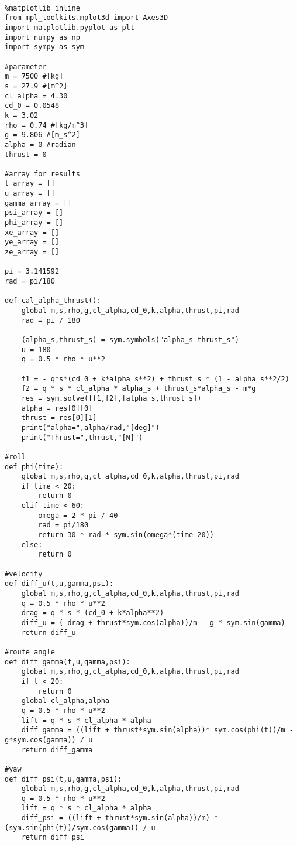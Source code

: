 \documentclass[15pt,uplatex,dvipdfmx]{jsarticle}
\begin{document}
\begin{lstlisting}[basicstyle=\ttfamily\footnotesize, frame=single]

%matplotlib inline
from mpl_toolkits.mplot3d import Axes3D
import matplotlib.pyplot as plt
import numpy as np
import sympy as sym

#parameter
m = 7500 #[kg]
s = 27.9 #[m^2]
cl_alpha = 4.30
cd_0 = 0.0548
k = 3.02
rho = 0.74 #[kg/m^3]
g = 9.806 #[m_s^2]
alpha = 0 #radian
thrust = 0

#array for results
t_array = []
u_array = []
gamma_array = []
psi_array = []
phi_array = []
xe_array = []
ye_array = []
ze_array = []

pi = 3.141592
rad = pi/180

def cal_alpha_thrust():
    global m,s,rho,g,cl_alpha,cd_0,k,alpha,thrust,pi,rad
    rad = pi / 180

    (alpha_s,thrust_s) = sym.symbols("alpha_s thrust_s")
    u = 180
    q = 0.5 * rho * u**2

    f1 = - q*s*(cd_0 + k*alpha_s**2) + thrust_s * (1 - alpha_s**2/2)
    f2 = q * s * cl_alpha * alpha_s + thrust_s*alpha_s - m*g
    res = sym.solve([f1,f2],[alpha_s,thrust_s])
    alpha = res[0][0]
    thrust = res[0][1]
    print("alpha=",alpha/rad,"[deg]")
    print("Thrust=",thrust,"[N]")

#roll
def phi(time):
    global m,s,rho,g,cl_alpha,cd_0,k,alpha,thrust,pi,rad
    if time < 20:
        return 0
    elif time < 60:
        omega = 2 * pi / 40
        rad = pi/180
        return 30 * rad * sym.sin(omega*(time-20))
    else:
        return 0

#velocity
def diff_u(t,u,gamma,psi):
    global m,s,rho,g,cl_alpha,cd_0,k,alpha,thrust,pi,rad
    q = 0.5 * rho * u**2
    drag = q * s * (cd_0 + k*alpha**2)
    diff_u = (-drag + thrust*sym.cos(alpha))/m - g * sym.sin(gamma)
    return diff_u

#route angle
def diff_gamma(t,u,gamma,psi):
    global m,s,rho,g,cl_alpha,cd_0,k,alpha,thrust,pi,rad
    if t < 20:
        return 0
    global cl_alpha,alpha
    q = 0.5 * rho * u**2
    lift = q * s * cl_alpha * alpha
    diff_gamma = ((lift + thrust*sym.sin(alpha))* sym.cos(phi(t))/m - g*sym.cos(gamma)) / u
    return diff_gamma

#yaw
def diff_psi(t,u,gamma,psi):
    global m,s,rho,g,cl_alpha,cd_0,k,alpha,thrust,pi,rad
    q = 0.5 * rho * u**2
    lift = q * s * cl_alpha * alpha
    diff_psi = ((lift + thrust*sym.sin(alpha))/m) * (sym.sin(phi(t))/sym.cos(gamma)) / u
    return diff_psi


\end{lstlisting}
\end{document}
